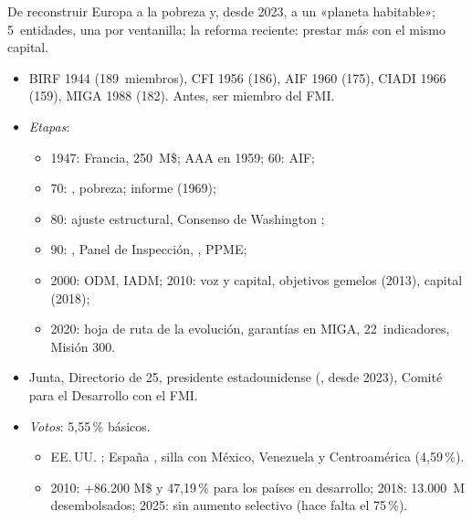\documentclass{article}
\begin{document}
\begin{columnas}
\begin{ideaclave}
De reconstruir Europa a la pobreza y, desde 2023, a un «planeta habitable»; 5~entidades, una por ventanilla; la reforma reciente: prestar más con el mismo capital.
\end{ideaclave}
\begin{itemize}
\item BIRF 1944 (189~miembros), CFI 1956 (186), AIF 1960 (175), CIADI 1966 (159), MIGA 1988 (182). Antes, ser miembro del FMI.
\item \emph{Etapas}:
  \begin{itemize}
  \item 1947: Francia, 250~M\$; AAA en 1959; 60: AIF;
  \item 70: , pobreza; informe  (1969);
  \item 80: ajuste estructural, Consenso de Washington ;
  \item 90: , Panel de Inspección, , PPME;
  \item 2000: ODM, IADM; 2010: voz y capital, objetivos gemelos (2013), capital (2018);
  \item 2020: hoja de ruta de la evolución, garantías en MIGA, 22~indicadores, Misión 300.
  \end{itemize}
\end{itemize}
\begin{itemize}
\item Junta, Directorio de 25, presidente estadounidense (, desde 2023), Comité para el Desarrollo con el FMI.
\item \emph{Votos}: 5,55\,\% básicos.
  \begin{itemize}
  \item EE.\,UU. ; España , silla con México, Venezuela y Centroamérica (4,59\,\%).
  \item 2010: +86.200 M\$ y 47,19\,\% para los países en desarrollo; 2018: 13.000~M desembolsados; 2025: sin aumento selectivo (hace falta el 75\,\%).
  \end{itemize}
\end{itemize}

\end{columnas}
\end{document}
